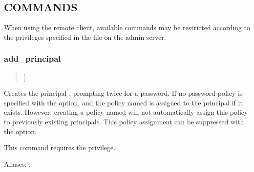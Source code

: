 \documentclass[letterpaper,10pt,english]{sphinxmanual}
\begin{document}
\subsection{COMMANDS}
\label{\detokenize{admin/admin_commands/kadmin_local:commands}}
\sphinxAtStartPar
When using the remote client, available commands may be restricted
according to the privileges specified in the {\hyperref[\detokenize{admin/conf_files/kadm5_acl:kadm5-acl-5}]{}} file
on the admin server.


\subsubsection{add\_principal}
\label{\detokenize{admin/admin_commands/kadmin_local:add-principal}}\label{\detokenize{admin/admin_commands/kadmin_local:id1}}\begin{quote}

\sphinxAtStartPar
{} {[}\sphinxstyleemphasis{options}{]} 
\end{quote}

\sphinxAtStartPar
Creates the principal , prompting twice for a password.  If
no password policy is specified with the  option, and the
policy named  is assigned to the principal if it exists.
However, creating a policy named  will not automatically
assign this policy to previously existing principals.  This policy
assignment can be suppressed with the  option.

\sphinxAtStartPar
This command requires the  privilege.

\sphinxAtStartPar
Aliases: , 
\end{document}
